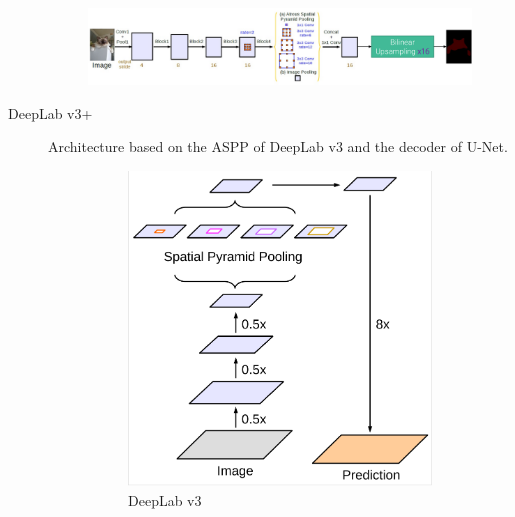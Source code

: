 \begin{description}
        \begin{figure}[H]
            \centering
            \includegraphics[width=0.95\linewidth]{./img/_deeplabv3.pdf}
        \end{figure}

    \item[DeepLab v3+] 
        Architecture based on the ASPP of DeepLab v3 and the decoder of U-Net.

        \begin{figure}[H]
            \centering
            \begin{subfigure}{0.3\linewidth}
                \centering
                \includegraphics[width=0.9\linewidth]{./img/_deeplabv3plus_1.pdf}
                \caption{DeepLab v3}
            \end{subfigure}
            \begin{subfigure}{0.3\linewidth}
                \centering

\end{subfigure}
\end{figure}
\end{description}
